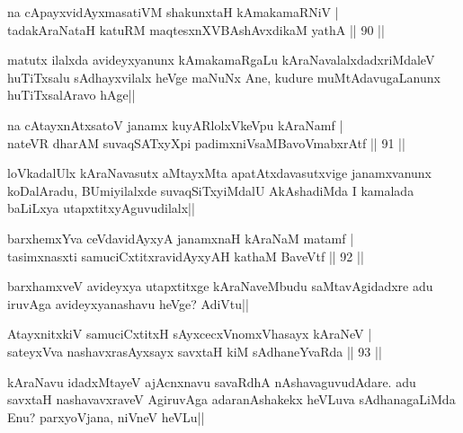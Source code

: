 
\begin{shl}
na cApayxvidAyxmasatiVM shakunxtaH kAmakamaRNiV |\\
tadakAraNataH katuRM maqtesxnXVBAshAvxdikaM yathA \hfill || 90 ||
\end{shl}

\begin{artha}
matutx ilalxda avideyxyanunx kAmakamaRgaLu kAraNavalalxdadxriMdaleV huTiTxsalu 
sAdhayxvilalx heVge maNuNx Ane, kudure muMtAdavugaLanunx huTiTxsalAravo hAge||
\end{artha}

\begin{shl}
na cAtayxnAtxsatoV janamx kuyARlolxVkeV\s pu kAraNamf |\\
nateVR dharAM suvaqSATxyX\s pi padimxniVsaMBavoV\s mabxrAtf \hfill || 91 ||
\end{shl}

\begin{artha}
loVkadalUlx kAraNavasutx aMtayxMta apatAtxdavasutxvige janamxvanunx koDalAradu, BUmiyilalxde suvaqSiTxyiMdalU AkAshadiMda I kamalada baLiLxya utapxtitxyAguvudilalx||
\end{artha}

\begin{shl}
barxhemxYva ceVdavidAyxyA janamxnaH kAraNaM matamf |\\
tasimxnasxti samuciCxtitxravidAyxyAH kathaM BaveVtf \hfill || 92 ||
\end{shl}

\begin{artha}
barxhamxveV avideyxya  utapxtitxge kAraNaveMbudu saMtavAgidadxre adu iruvAga avideyxyanashavu heVge? AdiVtu||
\end{artha}

\begin{shl}
AtayxnitxkiV samuciCxtitxH sAyxcecxVnomxVhasayx kAraNeV |\\
sateyxVva nashavxrasAyxsayx savxtaH kiM sAdhaneYvaRda \hfill || 93 ||
\end{shl}

\begin{artha}
kAraNavu idadxMtayeV ajAcnxnavu savaRdhA nAshavaguvudAdare. adu savxtaH nashavavxraveV AgiruvAga adaranAshakekx heVLuva sAdhanagaLiMda Enu? parxyoVjana, niVneV heVLu||
\end{artha}


